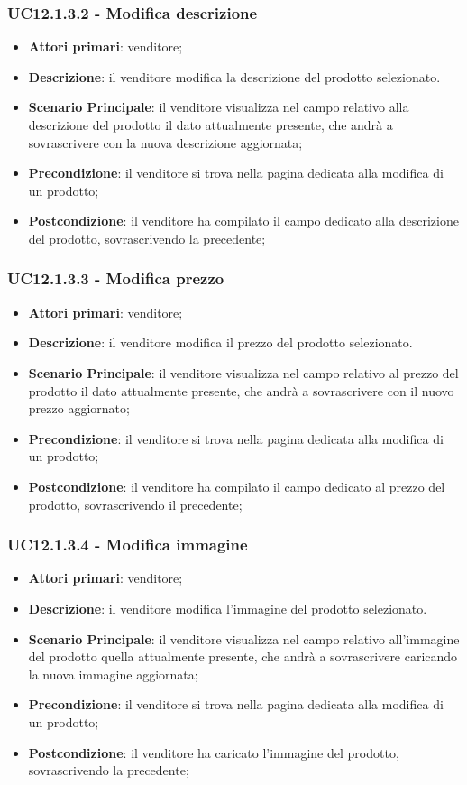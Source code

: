 \subsubsection{UC12.1.3.2 - Modifica descrizione}
\begin{itemize}
\item \textbf{Attori primari}: venditore;
\item \textbf{Descrizione}: il venditore modifica la descrizione del prodotto selezionato.
\item \textbf{Scenario Principale}: il venditore visualizza nel campo relativo alla descrizione del prodotto il dato attualmente presente, che andrà a sovrascrivere con la nuova descrizione aggiornata;
\item \textbf{Precondizione}: il venditore si trova nella pagina dedicata alla modifica di un prodotto;
\item \textbf{Postcondizione}: il venditore ha compilato il campo dedicato alla descrizione del prodotto, sovrascrivendo la precedente;
\end{itemize}

\subsubsection{UC12.1.3.3 - Modifica prezzo}
\begin{itemize}
\item \textbf{Attori primari}: venditore;
\item \textbf{Descrizione}: il venditore modifica il prezzo del prodotto selezionato.
\item \textbf{Scenario Principale}: il venditore visualizza nel campo relativo al prezzo del prodotto il dato attualmente presente, che andrà a sovrascrivere con il nuovo prezzo aggiornato;
\item \textbf{Precondizione}: il venditore si trova nella pagina dedicata alla modifica di un prodotto;
\item \textbf{Postcondizione}: il venditore ha compilato il campo dedicato al prezzo del prodotto, sovrascrivendo il precedente;
\end{itemize}

\subsubsection{UC12.1.3.4 - Modifica immagine}
\begin{itemize}
\item \textbf{Attori primari}: venditore;
\item \textbf{Descrizione}: il venditore modifica l'immagine del prodotto selezionato.
\item \textbf{Scenario Principale}: il venditore visualizza nel campo relativo all'immagine del prodotto quella attualmente presente, che andrà a sovrascrivere caricando la nuova immagine aggiornata;
\item \textbf{Precondizione}: il venditore si trova nella pagina dedicata alla modifica di un prodotto;
\item \textbf{Postcondizione}: il venditore ha caricato l'immagine del prodotto, sovrascrivendo la precedente;
\end{itemize}

